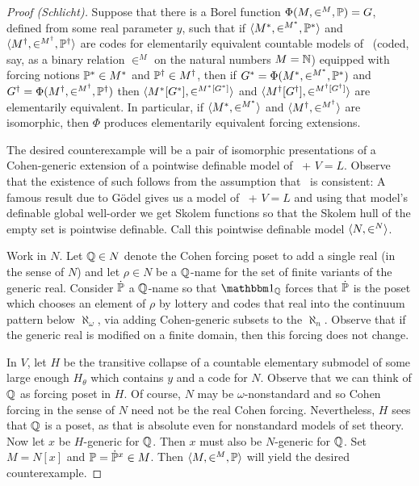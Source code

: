 \documentclass{amsart}
\begin{document}
\begin{proof}[Proof (Schlicht)]
Suppose that there is a Borel function $\Phi(M,\in^M,\P)=G$, defined from some real parameter $y$, such that if $\<M^*,\in^{M^*},\P^*>$ and $\<M^\dagger,\in^{M^\dagger},\P^\dagger>$ are codes for elementarily equivalent countable models of \ZF\ (coded, say, as a binary relation $\in^M$ on the natural numbers $M=\N$) equipped with forcing notions $\P^*\in M^*$ and $\P^\dagger \in M^\dagger$, then if $G^* = \Phi(M^*,\in^{M^*},\P^*)$ and $G^\dagger = \Phi(M^\dagger,\in^{M^\dagger},\P^\dagger)$ then $\<M^*[G^*],\in^{M^*[G^*]}>$ and $\<M^\dagger[G^\dagger],\in^{M^\dagger[G^\dagger]}>$ are elementarily equivalent. In particular, if $\<M^*,\in^{M^*}>$ and $\<M^\dagger,\in^{M^\dagger}>$ are isomorphic, then $\Phi$ produces elementarily equivalent forcing extensions.

The desired counterexample will be a pair of isomorphic presentations of a Cohen-generic extension of a pointwise definable model of \ZF\ + $V = L$. Observe that the existence of such follows from the assumption that \ZF\ is consistent: A famous result due to G\"odel gives us a model of \ZF\ + $V = L$ and using that model's definable global well-order we get Skolem functions so that the Skolem hull of the empty set is pointwise definable. Call this pointwise definable model \hbox{$\<N,\in^N>$}.

Work in $N$. Let $\Q \in N$ denote the Cohen forcing poset to add a single real (in the sense of $N$) and let $\rho \in N$ be a $\Q$-name for the set of finite variants of the generic real. Consider $\dot\P$ a $\Q$-name so that $\one_\Q$ forces that $\dot\P$ is the poset which chooses an element of $\rho$ by lottery and codes that real into the continuum pattern below $\aleph_\omega$, via adding Cohen-generic subsets to the $\aleph_n$. Observe that if the generic real is modified on a finite domain, then this forcing does not change.

In $V$, let $H$ be the transitive collapse of a countable elementary submodel of some large enough $H_\theta$ which contains $y$ and a code for $N$. Observe that we can think of $\Q$ as forcing poset in $H$. Of course, $N$ may be $\omega$-nonstandard and so Cohen forcing in the sense of $N$ need not be the real Cohen forcing. Nevertheless, $H$ sees that $\Q$ is a poset, as that is absolute even for nonstandard models of set theory. Now let $x$ be $H$-generic for $\Q$. Then $x$ must also be $N$-generic for $\Q$. Set $M = N[x]$ and $\P = \dot\P^x \in M$. Then $\<M,\in^M,\P>$ will yield the desired counterexample.


\end{proof}
\end{document}

